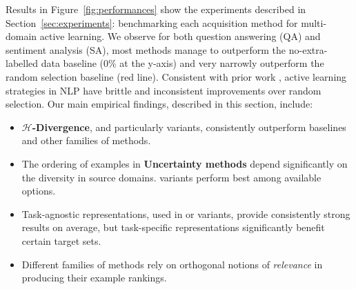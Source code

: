     Results in Figure~\ref{fig:performances} show the experiments described in Section~\ref{sec:experiments}: benchmarking each acquisition method for multi-domain active learning.
    We observe for both question answering (QA) and sentiment analysis (SA), most methods manage to outperform the no-extra-labelled data baseline (0\% at the y-axis) and very narrowly outperform the random selection baseline (\textcolor{myred}{red} line).
    Consistent with prior work \citep{lowell2019practical}, active learning strategies in NLP have brittle and inconsistent improvements over random selection.
    Our main empirical findings, described in this section, include:
    \respace
    \begin{itemize}\itemsep0em
        \item \textbf{$\mathcal{H}$-Divergence}, and particularly \dale{} variants, consistently outperform baselines and other families of methods.
        \item The ordering of examples in \textbf{Uncertainty methods} depend significantly on the diversity in source domains.
        \bald{} variants perform best among available options.
        \item Task-agnostic representations, used in \textbf{\knn{}} or \textbf{\dal{}} variants, provide consistently strong results on average, but task-specific representations significantly benefit certain target sets.
        \item Different families of methods rely on orthogonal notions of \emph{relevance} in producing their example rankings.
    \end{itemize}
    
